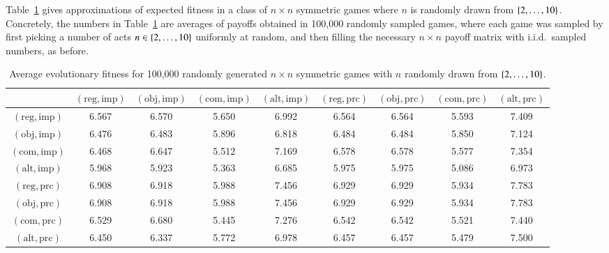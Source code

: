 \documentclass[fleqn,reqno,11pt]{article}
\begin{document}
Table~\ref{tab:ExpectedFitness_10x10} gives approximations of expected fitness in a class of
$n \times n$ symmetric games where $n$ is randomly drawn from $\left\{2, \dots, 10\right\}$. Concretely,
the numbers in Table~\ref{tab:ExpectedFitness_10x10} are averages of payoffs obtained in
100,000 randomly sampled games, where each game was sampled by first picking a number of acts
$n \in \left\{2, \dots, 10\right\}$ uniformly at random, and then filling the necessary $n \times n$
payoff matrix with i.i.d.~sampled numbers, as before.


\begin{table}[]
\centering
\footnotesize
\begin{tabular}{ccccccccc}
  \toprule
 & $(\text{reg}, \text{imp})$ 
 & $(\text{obj}, \text{imp})$ 
 & $(\text{com}, \text{imp})$
 & $(\text{alt}, \text{imp})$
 & $(\text{reg}, \text{prc})$ 
 & $(\text{obj}, \text{prc})$ 
 & $(\text{com}, \text{prc})$
 & $(\text{alt}, \text{prc})$ \\ 
  \midrule
  $(\text{reg}, \text{imp})$ & 6.567 & 6.570 & 5.650 & 6.992 & 6.564 & 6.564 & 5.593 & 7.409 \\
  $(\text{obj}, \text{imp})$ & 6.476 & 6.483 & 5.896 & 6.818 & 6.484 & 6.484 & 5.850 & 7.124 \\
  $(\text{com}, \text{imp})$ & 6.468 & 6.647 & 5.512 & 7.169 & 6.578 & 6.578 & 5.577 & 7.354 \\
  $(\text{alt}, \text{imp})$ & 5.968 & 5.923 & 5.363 & 6.685 & 5.975 & 5.975 & 5.086 & 6.973 \\
  $(\text{reg}, \text{prc})$ & 6.908 & 6.918 & 5.988 & 7.456 & 6.929 & 6.929 & 5.934 & 7.783 \\
  $(\text{obj}, \text{prc})$ & 6.908 & 6.918 & 5.988 & 7.456 & 6.929 & 6.929 & 5.934 & 7.783 \\
  $(\text{com}, \text{prc})$ & 6.529 & 6.680 & 5.445 & 7.276 & 6.542 & 6.542 & 5.521 & 7.440 \\
  $(\text{alt}, \text{prc})$ & 6.450 & 6.337 & 5.772 & 6.978 & 6.457 & 6.457 & 5.479 & 7.500 \\
   \bottomrule                         
\end{tabular}                      
\caption{Average evolutionary fitness for 100,000 randomly generated $n \times n$ symmetric games with $n$ randomly drawn from $\left\{2, \dots, 10\right\}$.}
\label{tab:ExpectedFitness_10x10}        
\end{table}
\end{document}
